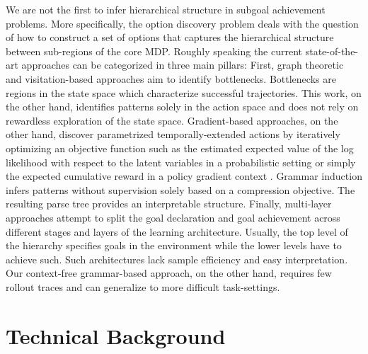 \documentclass[colorinlistoftodos]{article}
\theoremstyle{definition}
\begin{document}
We are not the first to infer hierarchical structure in subgoal achievement problems. More specifically, the option discovery problem deals with the question of how to construct a set of options \citep{Sutton_1999} that captures the hierarchical structure between sub-regions of the core MDP.
Roughly speaking the current state-of-the-art approaches can be categorized in three main pillars:
First, graph theoretic \citep{Hengst_2002, Menache_2002, Mannor_2004, Simsek_2004b} and visitation-based \citep{Mcgovern_2001, Stolle_2002, Simsek_2004b} approaches aim to identify bottlenecks. Bottlenecks are regions in the state space which characterize successful trajectories. This work, on the other hand, identifies patterns solely in the action space and does not rely on rewardless exploration of the state space.
%
Gradient-based approaches, on the other hand, discover parametrized temporally-extended actions by iteratively optimizing an objective function such as the estimated expected value of the log likelihood with respect to the latent variables in a probabilistic setting \citep{Daniel_2016} or simply the expected cumulative reward in a policy gradient context \citep{Bacon_2017, Smith_2018}. Grammar induction infers patterns without supervision solely based on a compression objective. The resulting parse tree provides an interpretable structure.
%
Finally, multi-layer \citep{Bakker_2004, Vezhnevets_2017, Florensa_2017} approaches attempt to split the goal declaration and goal achievement across different stages and layers of the learning architecture. Usually, the top level of the hierarchy specifies goals in the environment while the lower levels have to achieve such. Such architectures lack sample efficiency and easy interpretation. Our context-free grammar-based approach, on the other hand, requires few rollout traces and can generalize to more difficult task-settings. 

\newpage
\section{Technical Background}
\end{document}
